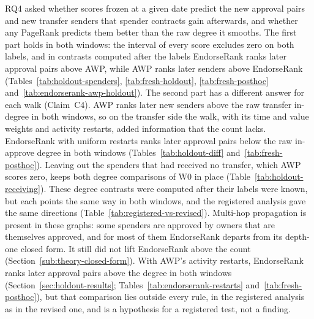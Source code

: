 RQ4 asked whether scores frozen at a given date predict the new approval pairs and new transfer senders that spender contracts gain afterwards, and whether any PageRank predicts them better than the raw degree it smooths. The first part holds in both windows: the interval of every score excludes zero on both labels, and in contrasts computed after the labels EndorseRank ranks later approval pairs above AWP, while AWP ranks later senders above EndorseRank (Tables~\ref{tab:holdout-spenders}, \ref{tab:fresh-holdout}, \ref{tab:fresh-posthoc} and~\ref{tab:endorserank-awp-holdout}). The second part has a different answer for each walk (Claim~C4). AWP ranks later new senders above the raw transfer in-degree in both windows, so on the transfer side the walk, with its time and value weights and activity restarts, added information that the count lacks. EndorseRank with uniform restarts ranks later approval pairs below the raw in-approve degree in both windows (Tables~\ref{tab:holdout-diff} and~\ref{tab:fresh-posthoc}). Leaving out the spenders that had received no transfer, which AWP scores zero, keeps both degree comparisons of W0 in place (Table~\ref{tab:holdout-receiving}). These degree contrasts were computed after their labels were known, but each points the same way in both windows, and the registered analysis gave the same directions (Table~\ref{tab:registered-vs-revised}). Multi-hop propagation is present in these graphs: some spenders are approved by owners that are themselves approved, and for most of them EndorseRank departs from its depth-one closed form. It still did not lift EndorseRank above the count (Section~\ref{sub:theory-closed-form}). With AWP's activity restarts, EndorseRank ranks later approval pairs above the degree in both windows (Section~\ref{sec:holdout-results}; Tables~\ref{tab:endorserank-restarts} and~\ref{tab:fresh-posthoc}), but that comparison lies outside every rule, in the registered analysis as in the revised one, and is a hypothesis for a registered test, not a finding.

